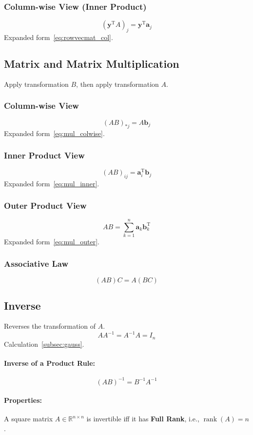 \documentclass{article}
\begin{document}
\subsubsection{Column-wise View (Inner Product)}
\[
    (\mathbf{y}^{\mathrm{T}} A)_j = \mathbf{y}^{\mathrm{T}} \mathbf{a}_j
\]
Expanded form~\ref{eq:rowvecmat_col}.

\subsection{Matrix and Matrix Multiplication}
Apply transformation $B$, then apply transformation $A$.

\subsubsection{Column-wise View}
\[
    (AB)_{*j} = A\mathbf{b}_j
\]
Expanded form~\ref{eq:mul_colwise}.

\subsubsection{Inner Product View}
\[
    (AB)_{ij} = \mathbf{a}_i^{\mathrm{T}} \mathbf{b}_j
\]
Expanded form~\ref{eq:mul_inner}.

\subsubsection{Outer Product View}
\[
    AB = \sum_{k=1}^n \mathbf{a}_k \mathbf{b}_k^{\mathrm{T}}
\]
Expanded form~\ref{eq:mul_outer}.

\subsubsection{Associative Law}
\[
    (AB)C = A(BC)
\]

\subsection{Inverse}
Reverses the transformation of $A$.
\[
    A A^{-1} = A^{-1} A = I_n
\]
Calculation~\ref{subsec:gauss}.
\paragraph{Inverse of a Product Rule:}
\[
    (AB)^{-1} = B^{-1}A^{-1}
\]
\paragraph{Properties:} A square matrix $A \in \mathbb{R}^{n \times n}$ is invertible iff it has \textbf{Full Rank}, i.e., $\operatorname{rank}(A) = n$.
\end{document}
